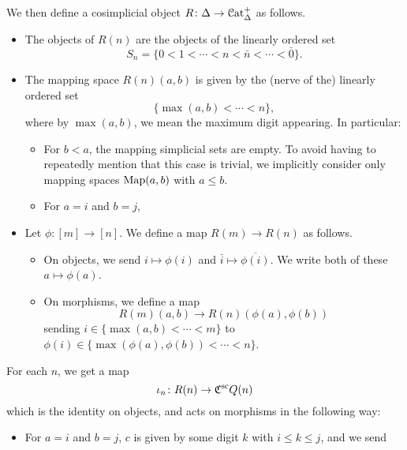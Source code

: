 \documentclass[main.tex]{subfiles}
\begin{document}
We then define a cosimplicial object $R\colon \Delta \to \mathcal{C}\mathrm{at}_{\Delta}^{+}$ as follows.
\begin{itemize}
  \item The objects of $R(n)$ are the objects of the linearly ordered set
    \begin{equation*}
      S_{n} = \{0 < 1 < \cdots < n < \bar{n} < \cdots < \bar{0}\}.
    \end{equation*}

  \item The mapping space $R(n)(a, b)$ is given by the (nerve of the) linearly ordered set
    \begin{equation*}
      \{\max(a, b) < \cdots < n\},
    \end{equation*}
    where by $\max(a, b)$, we mean the maximum digit appearing. In particular: 
    \begin{itemize}
      \item For $b < a$, the mapping simplicial sets are empty. To avoid having to repeatedly mention that this case is trivial, we implicitly consider only mapping spaces $\mathrm{Map}(a, b)$ with $a \leq b$.

      \item For $a = i$ and $b = j$, 
    \end{itemize}

  \item Let $\phi\colon [m] \to [n]$. We define a map $R(m) \to R(n)$ as follows.
    \begin{itemize}
      \item On objects, we send $i \mapsto \phi(i)$ and $\bar{i} \mapsto \overline{\phi(i)}$. We write both of these $a \mapsto \phi(a)$.

      \item On morphisms, we define a map
        \begin{equation*}
          R(m)(a, b) \to R(n)(\phi(a), \phi(b))
        \end{equation*}
        sending $i \in \{\max(a, b) < \cdots < m\}$ to $\phi(i) \in \{\max(\phi(a), \phi(b)) < \cdots < n\}$.
    \end{itemize}
\end{itemize}

For each $n$, we get a map
\begin{equation*}
  \iota_{n}\colon R(n) \to \mathfrak{C}^{\mathrm{sc}} Q(n)
\end{equation*}
which is the identity on objects, and acts on morphisms in the following way:
\begin{itemize}
  \item For $a = i$ and $b = j$, $c$ is given by some digit $k$ with $i \leq k \leq j$, and we send
\end{itemize}
\end{document}
